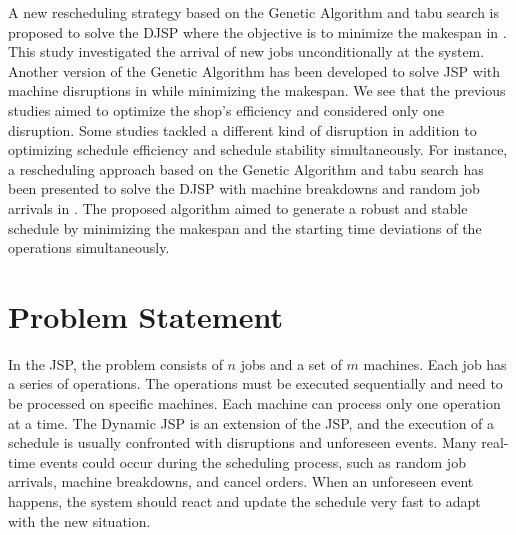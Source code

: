 \documentclass{article}
\begin{document}
A new rescheduling strategy based on the Genetic Algorithm and tabu search is proposed to solve the DJSP where the objective is to minimize the makespan in \cite{ali2019adopted}. This study investigated the arrival of new jobs unconditionally at the system. Another version of the Genetic Algorithm has been developed to solve JSP with machine disruptions in \cite{wang2013novel} while minimizing the makespan. We see that the previous studies aimed to optimize the shop's efficiency and considered only one disruption. Some studies tackled a different kind of disruption in addition to optimizing schedule efficiency and schedule stability simultaneously. For instance, a rescheduling approach based on the Genetic Algorithm and tabu search has been presented to solve the DJSP with machine breakdowns and random job arrivals in \cite{zhang2013hybrid}. The proposed algorithm aimed to generate a robust and stable schedule by minimizing the makespan and the starting time deviations of the operations simultaneously. \\

\section{Problem Statement}
In the JSP, the problem consists of $n$ jobs and a set of $m$ machines. Each job has a series of operations. The operations must be executed sequentially and need to be processed on specific machines. Each machine can process only one operation at a time. The Dynamic JSP is an extension of the JSP, and the execution of a schedule is usually confronted with disruptions and unforeseen events. Many real-time events could occur during the scheduling process, such as random job arrivals, machine breakdowns, and cancel orders. When an unforeseen event happens, the system should react and update the schedule very fast to adapt with the new situation. \\
\end{document}
